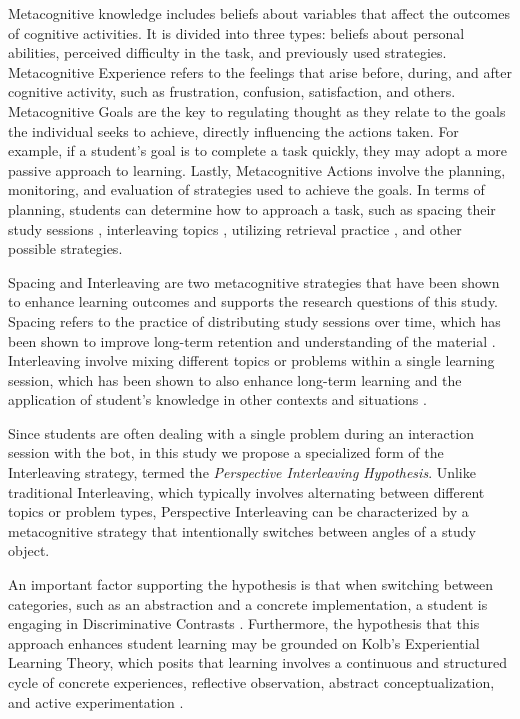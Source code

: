 \documentclass[a4paper,twoside]{article}
\begin{document}
Metacognitive knowledge includes beliefs about variables that affect the
outcomes of cognitive activities. It is divided into three types: beliefs about
personal abilities, perceived difficulty in the task, and previously used
strategies. Metacognitive Experience refers to the feelings that arise before,
during, and after cognitive activity, such as frustration, confusion,
satisfaction, and others. Metacognitive Goals are the key to regulating thought
as they relate to the goals the individual seeks to achieve, directly
influencing the actions taken. For example, if a student’s goal is to complete
a task quickly, they may adopt a more passive approach to learning. Lastly,
Metacognitive Actions involve the planning, monitoring, and evaluation of
strategies used to achieve the goals. In terms of planning, students can
determine how to approach a task, such as spacing their study sessions
\citep{Ouhao18, Carvalho20}, interleaving topics \citep{Rivers21}, utilizing
retrieval practice \citep{larsen18}, and other possible strategies.

Spacing and Interleaving are two metacognitive strategies that have been shown
to enhance learning outcomes and supports the research questions of this study.
Spacing refers to the practice of distributing study sessions over time, which
has been shown to improve long-term retention and understanding of the material
\citep{Carvalho20}. Interleaving involve mixing different topics or problems
within a single learning session, which has been shown to also enhance long-term
learning and the application of student's knowledge in other contexts and
situations \citep{Rivers21}.

Since students are often dealing with a single problem during an interaction
session with the bot, in this study we propose a specialized form of the
Interleaving strategy, termed the \textit{Perspective Interleaving Hypothesis}.
Unlike traditional Interleaving, which typically involves alternating between
different topics or problem types, Perspective Interleaving can be characterized
by a metacognitive strategy that intentionally switches between angles of a
study object.

An important factor supporting the hypothesis is that when switching between
categories, such as an abstraction and a concrete implementation, a student is
engaging in Discriminative Contrasts \citep{kang12}. Furthermore, the hypothesis
that this approach enhances student learning may be grounded on Kolb’s
Experiential Learning Theory, which posits that learning involves a continuous
and structured cycle of concrete experiences, reflective observation, abstract
conceptualization, and active experimentation \citep{kolb14}.
\end{document}
